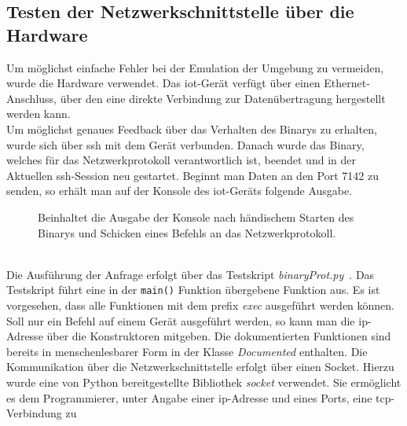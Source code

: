 
\subsection{Testen der Netzwerkschnittstelle über die Hardware}\label{subsec: hardware}
Um möglichst einfache Fehler bei der Emulation der Umgebung zu vermeiden, wurde die Hardware verwendet.
Das \gls{iot}-Gerät verfügt über einen Ethernet-Anschluss, über den eine direkte Verbindung zur Datenübertragung
hergestellt werden kann.\\
Um möglichst genaues Feedback über das Verhalten des Binarys zu erhalten, wurde sich über \gls{ssh} mit dem Gerät verbunden.
Danach wurde das Binary, welches für das Netzwerkprotokoll verantwortlich ist, beendet und in der Aktuellen \gls{ssh}-Session neu gestartet.
Beginnt man Daten an den Port 7142 zu senden, so erhält man auf der Konsole des \gls{iot}-Geräts folgende Ausgabe.
\begin{figure}[h]
    \caption{Beinhaltet die Ausgabe der Konsole nach händischem Starten des Binarys und Schicken eines Befehls an das Netzwerkprotokoll.}\label{fig:cmd-debug-info}
\end{figure}\\
Die Ausführung der Anfrage erfolgt über das Testskript \textit{binaryProt.py}~\cite{binaryProt-py}.
Das Testskript führt eine in der \texttt{main()} Funktion übergebene Funktion aus.
Es ist vorgesehen, dass alle Funktionen mit dem prefix \textit{exec} ausgeführt werden können.
Soll nur ein Befehl auf einem Gerät ausgeführt werden, so kann man die \gls{ip}-Adresse über die Konstruktoren mitgeben.
Die dokumentierten Funktionen sind bereits in menschenlesbarer Form in der Klasse \textit{Documented} enthalten.
Die Kommunikation über die Netzwerkschnittstelle erfolgt über einen Socket.
Hierzu wurde eine von Python bereitgestellte Bibliothek \textit{socket} verwendet.
Sie ermöglicht es dem Programmierer, unter Angabe einer \gls{ip}-Adresse und eines Ports, eine \gls{tcp}-Verbindung zu

